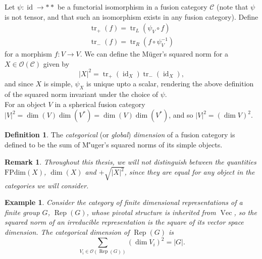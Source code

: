 \documentclass[a4paper, 10pt]{book}
\newtheorem{Expl}[theorem]{Example}
\newtheorem{Rem}[theorem]{Remark}
\theoremstyle{definition}
\newtheorem{Def}[theorem]{Definition}
\numberwithin{equation}{chapter}
\newcommand\tr{\operatorname{tr}}
\newcommand\inv{^{-1}}
\newcommand\id{\operatorname{id}}
\newcommand\Rep{\operatorname{Rep}}
\newcommand\Vect{\operatorname{Vec}}
\newcommand\FPdim{\text{FPdim}}
\newcommand\C{\mathcal C}
\newcommand\OO{\mathcal O}
\newcommand{\ra}\rightarrow
\begin{document}
Let $\psi:\id\ra **$ be a functorial isomorphism in a fusion category $\C$ (note that $\psi$ is not tensor, and that such an isomorphism exists in any fusion category). Define \begin{align}
	\tr_+(f) = \tr_L(\psi_V\circ f)\\
	\tr_-(f) = \tr_R(f\circ \psi_V\inv)
\end{align}
for a morphism $f: V\rightarrow V$. We can define the M\"uger's squared norm for a $X\in \OO(\C)$ given by \begin{equation*}
	|X|^2 = \tr_+(\id_X)\tr_-(\id_X),
\end{equation*}
and since $X$ is simple, $\psi_X$ is unique upto a scalar, rendering the above definition of the squared norm invariant under the choice of $\psi$. \\ For an object $V$ in a spherical fusion category $|V|^2 = \dim (V)\dim (V^*) = \dim (V)\dim (V^*)$, and so $|V|^2 = (\dim V)^2$. 
\begin{Def}
The \textit{categorical} (or \textit{global}) \textit{dimension} of a fusion category is defined to be the sum of M\''uger's squared norms of its simple objects.
\end{Def}
\begin{Rem}\rm
Throughout this thesis, we will not distinguish between the quantities $\FPdim(X)$, $\dim(X)$ and $+\sqrt{|X|^2}$, since they are equal for any object in the categories we will consider.
\end{Rem}
\begin{Expl}\rm
Consider the category of finite dimensional representations of a finite group $G$, $\Rep(G)$, whose pivotal structure is inherited from $\Vect$, so the squared norm of an irreducible representation is the square of its vector space dimension. The categorical dimension of $\Rep(G)$ is \begin{equation*}
	\sum_{V_i\in \OO(\Rep(G))} (\dim V_i)^2 = |G|.
\end{equation*}
\end{Expl}
\end{document}
